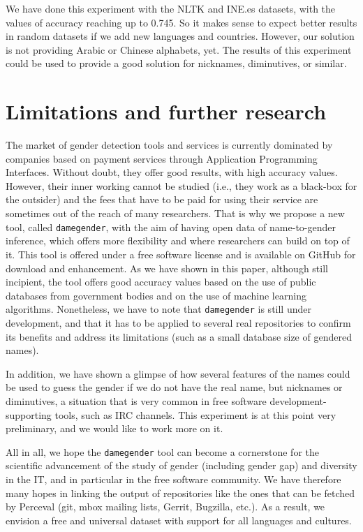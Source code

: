 \documentclass[a4paper]{article}
\begin{document}
We have done this experiment with the NLTK and INE.es datasets, with the values of accuracy reaching up to 0.745.
So it makes sense to expect better results in random datasets if we add new languages and countries.
However, our solution is not providing Arabic or Chinese alphabets, yet.
The results of this experiment could be used to provide a good solution for nicknames, diminutives, or similar.


\section{Limitations and further research}
\label{sec:limitations}

The market of gender detection tools and services is currently dominated by companies based on payment services through Application Programming Interfaces.
Without doubt, they offer good results, with high accuracy values.
However, their inner working cannot be studied (i.e., they work as a black-box for the outsider) and the fees that have to be paid for using their service are sometimes out of the reach of many researchers.
That is why we propose a new tool, called \texttt{damegender}, with the aim of having open data of name-to-gender inference, which offers more flexibility and where researchers can build on top of it.
This tool is offered under a free software license and is available on GitHub for download and enhancement.
As we have shown in this paper, although still incipient, the tool offers good accuracy values based on the use of public databases from government bodies and on the use of machine learning algorithms.
Nonetheless, we have to note that \texttt{damegender} is still under development, and that it has to be applied to several real repositories to confirm its benefits and address its limitations (such as a small database size of gendered names).

In addition, we have shown a glimpse of how several features of the names could be used to guess the gender if we do not have the real name, but nicknames or diminutives, a situation that is very common in free software development-supporting tools, such as IRC channels.
This experiment is at this point very preliminary, and we would like to work more on it.

All in all, we hope the \texttt{damegender} tool can become a cornerstone for the scientific advancement of the study of gender (including gender gap) and diversity in the IT, and in particular in the free software community.
We have therefore many hopes in linking the output of repositories like the ones that can be fetched by Perceval (git, mbox mailing lists, Gerrit, Bugzilla, etc.).
As a result, we envision a free and universal dataset with support for all languages and cultures.
\end{document}
